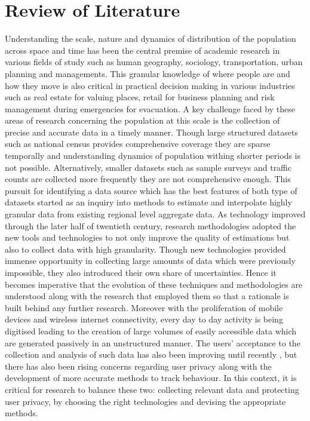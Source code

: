 \chapter{Review of Literature}\label{chapter:literature}

Understanding the scale, nature and dynamics of distribution of the population across space and time has been the central premise of academic research in various fields of study such as human geography, sociology, transportation, urban planning and managements.
This granular knowledge of where people are and how they move is also critical in practical decision making in various industries such as real estate for valuing places, retail for business planning and risk management during emergencies for evacuation.
A key challenge faced by these areas of research concerning the population at this scale is the collection of precise and accurate data in a timely manner.
Though large structured datasets such as national census provides comprehensive coverage they are sparse temporally and understanding dynamics of population withing shorter periods is not possible.
Alternatively, smaller datasets such as sample surveys and traffic counts are collected more frequently they are not comprehensive enough. 
This pursuit for identifying a data source which has the best features of both type of datasets started as an inquiry into methods to estimate and interpolate highly granular data from existing regional level aggregate data.
As technology improved through the later half of twentieth century, research methodologies adopted the new tools and technologies to not only improve the quality of estimations but also to collect data with high granularity.
Though new technologies provided immense opportunity in collecting large amounts of data which were previously impossible, they also introduced their own share of uncertainties.
Hence it becomes imperative that the evolution of these techniques and methodologies are understood along with the research that employed them so that a rationale is built behind any further research.
Moreover with the proliferation of mobile devices and wireless internet connectivity, every day to day activity is being digitised leading to the creation of large volumes of easily accessible data which are generated passively in an unstructured manner.
The users' acceptance to the collection and analysis of such data has also been improving until recently \cite{kobsa2014}, but there has also been rising concerns regarding user privacy along with the development of more accurate methods to track behaviour.
In this context, it is critical for research to balance these two: collecting relevant data and protecting user privacy, by choosing the right technologies and devising the appropriate methods.


